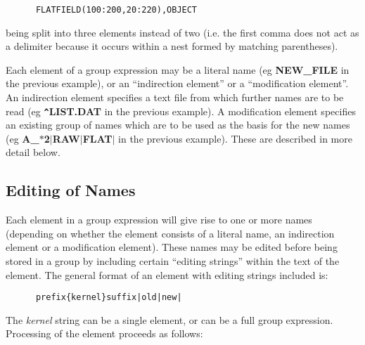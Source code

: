 \small
\begin{verbatim}
      FLATFIELD(100:200,20:220),OBJECT
\end{verbatim}
\normalsize

being split into three elements instead of two (i.e. the first comma does not
act as a delimiter because it occurs within a nest formed by matching parentheses).

Each element of a group expression may be a literal name (eg {\bf NEW\_FILE} in
the previous example), or an ``indirection element'' or a ``modification
element''. An indirection element specifies a text file from which further names
are to be read (eg {\bf \verb+^+LIST.DAT} in the previous example). A
modification element specifies an existing group of names which are to be used
as the basis for the new names (eg {\bf A\_$*$2$\mid$RAW$\mid$FLAT$\mid$} in the
previous example). These are described in more detail below.

\subsection{Editing of Names}
Each element in a group expression will give rise to one or more names
(depending on whether the element consists of a literal name, an indirection
element or a modification element). These names may be edited before being
stored in a group by including certain ``editing strings'' within the text of
the element. The general format of an element with editing strings included is:

\small
\begin{verbatim}
      prefix{kernel}suffix|old|new|
\end{verbatim}
\normalsize

The {\em kernel} string can be a single element, or can be a full group
expression. Processing of the element proceeds as follows:

